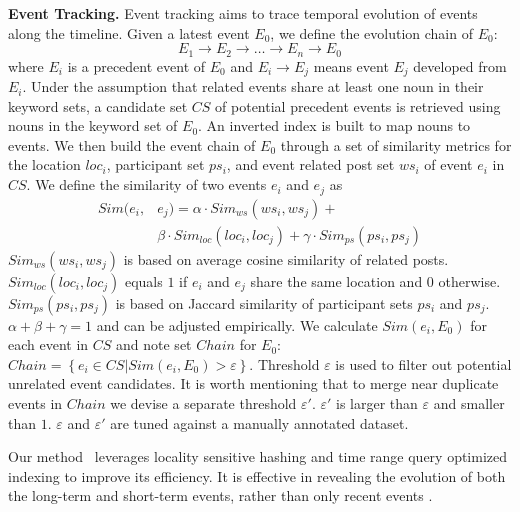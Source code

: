 \noindent\textbf{Event Tracking.}
\label{tracing}
Event tracking aims to trace temporal evolution of events along the timeline.
Given a latest event $E_{0}$, we define the evolution chain of $E_{0}$:
\begin{equation}
E_{1}\rightarrow E_{2}\rightarrow\ldots\rightarrow E_{n}\rightarrow E_{0}
\end{equation}
where $E_{i}$ is a precedent event of $E_{0}$ and $E_{i}\rightarrow E_{j}$ means event $E_{j}$ developed from $E_{i}$.
Under the assumption that related events share at least one noun in their keyword sets,
a candidate set $CS$ of potential precedent events is retrieved using nouns in the keyword set of $E_{0}$.
An inverted index is built to map nouns to events.
We then build the event chain of $E_{0}$ through a set of similarity metrics for
the location $loc_{i}$, participant set $ps_{i}$, and event related post set $ws_{i}$
of event $e_{i}$ in $CS$.
We define the similarity of two events $e_{i}$ and $e_{j}$ as
\begin{equation}
\begin{aligned}
Sim(e_{i}, &e_{j})=\alpha\cdot Sim_{ws}(ws_{i},ws_{j}) + \\& \beta\cdot Sim_{loc}(loc_{i},loc_{j})
+ \gamma\cdot Sim_{ps}(ps_{i},ps_{j})
\end{aligned}
\end{equation}
$Sim_{ws}(ws_{i},ws_{j})$ is based on average cosine similarity of related posts.
$Sim_{loc}(loc_{i},loc_{j})$ equals $1$ if $e_{i}$ and $e_{j}$ share the same location and 0 otherwise.
$Sim_{ps}(ps_{i},ps_{j})$ is based on Jaccard similarity of participant sets $ps_{i}$ and $ps_{j}$.
$\alpha+\beta+\gamma=1$ and can be adjusted empirically.
We calculate $Sim(e_{i}, E_{0})$ for each event in $CS$ and note set $Chain$ for $E_{0}$:
$Chain=\left\{ e_{i} \in CS | Sim(e_{i}, E_{0}) > \varepsilon \right\}$.
Threshold $\varepsilon$ is used to filter out potential unrelated event candidates.
It is worth mentioning that to merge near duplicate events in $Chain$ we devise a separate threshold $\varepsilon '$.
$\varepsilon '$ is larger than $\varepsilon$ and smaller than $1$.
$\varepsilon$ and $\varepsilon '$ are tuned against a manually annotated dataset.

Our method~\cite{lu2015discovering} leverages locality sensitive hashing and time range query optimized indexing to improve its efficiency.
It is effective in revealing the evolution of both the long-term and short-term events,
rather than only recent events \cite{lee2014cast, saha2012learning}.

